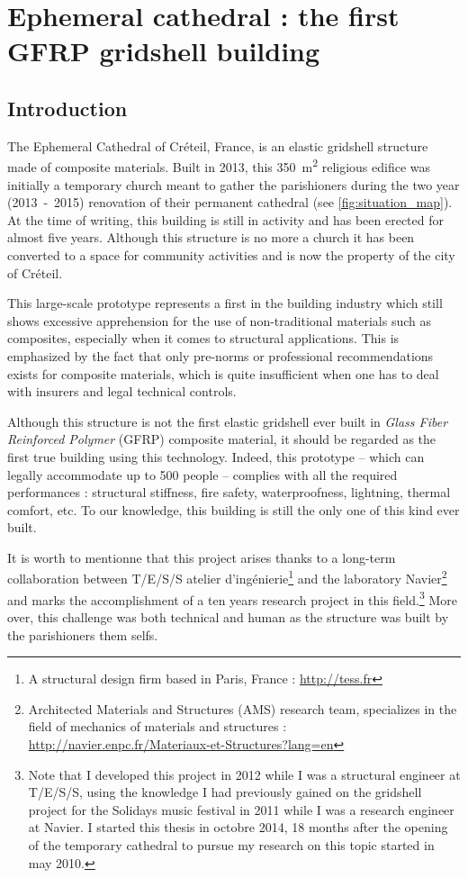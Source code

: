 \chapter{Ephemeral cathedral : the first GFRP gridshell building}

\section{Introduction}

The Ephemeral Cathedral of Créteil, France, is an elastic gridshell structure made of composite materials. Built in 2013, this 350~m\textsuperscript{2} religious edifice was initially a temporary church meant to gather the parishioners during the two year (2013~-~2015) renovation of their permanent cathedral (see \cref{fig:situation_map}). At the time of writing, this building is still in activity and has been erected for almost five years. Although this structure is no more a church it has been converted to a space for community activities and is now the property of the city of Créteil.

This large-scale prototype represents a first in the building industry which still shows excessive apprehension for the use of non-traditional materials such as composites, especially when it comes to structural applications. This is emphasized by the fact that only pre-norms or professional recommendations exists for composite materials, which is quite insufficient when one has to deal with insurers and legal technical controls.

Although this structure is not the first elastic gridshell ever built in \emph{Glass Fiber Reinforced Polymer} (GFRP) composite material, it should be regarded as the first true building using this technology. Indeed, this prototype -- which can legally accommodate up to 500 people -- complies with all the required performances : structural stiffness, fire safety, waterproofness, lightning, thermal comfort, etc. To our knowledge, this building is still the only one of this kind ever built.

It is worth to mentionne that this project arises thanks to a long-term collaboration between {T/E/S/S atelier d'ingénierie}\footnote{A structural design firm based in Paris, France : \url{http://tess.fr}} and the laboratory Navier\footnote{Architected Materials and Structures (AMS) research team, specializes in the field of mechanics of materials and structures : \url{http://navier.enpc.fr/Materiaux-et-Structures?lang=en}} and marks the accomplishment of a ten years research project in this field.\footnote{Note that I developed this project in 2012 while I was a structural engineer at T/E/S/S, using the knowledge I had previously gained on the gridshell project for the Solidays music festival in 2011 while I was a research engineer at Navier. I started this thesis in octobre 2014, 18 months after the opening of the temporary cathedral to pursue my research on this topic started in may 2010.} More over, this challenge was both technical and human as the structure was built by the parishioners them selfs.

